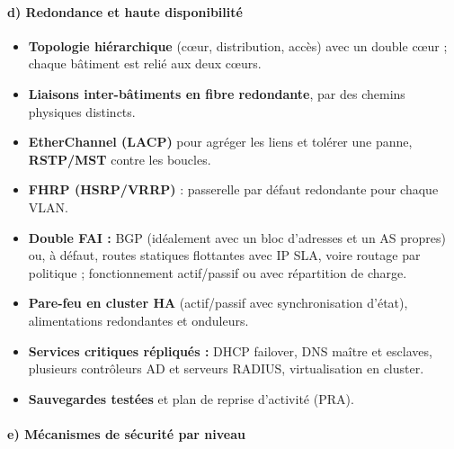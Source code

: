 \documentclass[12pt,a4paper]{article}
\begin{document}
\paragraph{d) Redondance et haute disponibilité}

\begin{itemize}
    \item \textbf{Topologie hiérarchique} (cœur, distribution, accès)
    avec un double cœur ; chaque bâtiment est relié aux deux cœurs.
    \item \textbf{Liaisons inter-bâtiments en fibre redondante}, par des
    chemins physiques distincts.
    \item \textbf{EtherChannel (LACP)} pour agréger les liens et tolérer
    une panne, \textbf{RSTP/MST} contre les boucles.
    \item \textbf{FHRP (HSRP/VRRP)} : passerelle par défaut redondante
    pour chaque VLAN.
    \item \textbf{Double FAI :} BGP (idéalement avec un bloc d'adresses
    et un AS propres) ou, à défaut, routes statiques flottantes avec IP
    SLA, voire routage par politique ; fonctionnement actif/passif ou
    avec répartition de charge.
    \item \textbf{Pare-feu en cluster HA} (actif/passif avec
    synchronisation d'état), alimentations redondantes et onduleurs.
    \item \textbf{Services critiques répliqués :} DHCP failover, DNS
    maître et esclaves, plusieurs contrôleurs AD et serveurs RADIUS,
    virtualisation en cluster.
    \item \textbf{Sauvegardes testées} et plan de reprise d'activité
    (PRA).
\end{itemize}

\paragraph{e) Mécanismes de sécurité par niveau}
\end{document}
